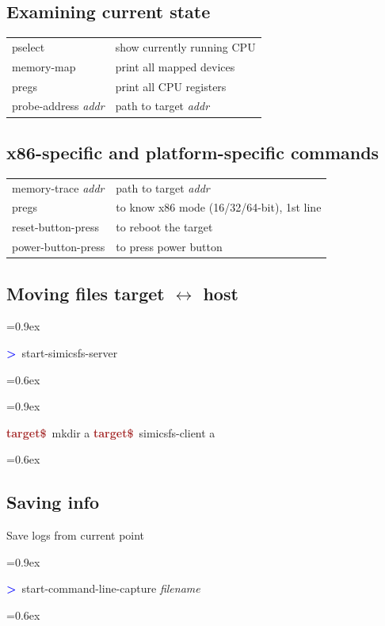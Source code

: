 \documentclass[8pt]{extarticle}
\newenvironment{code}[1][]{%
\begin{prebox}[#1]\obeylines%
\fontdimen2\font=0.9ex%
}{%
\end{prebox}%
\fontdimen2\font=0.6ex%
}
\newcommand{\tprompt}{\textcolor{brown}{\textbf{target\$}\ }}
\newcommand{\sprompt}{\textcolor{blue}{\textbf{>}\ }}
\newcommand{\p}[1]{\textit{\large#1}}
\begin{document}
\begin{multicols*}{3}
\subsection{Examining current state}

\noindent\begin{tabular}{ll}
    pselect & show currently running CPU \\
    memory-map & print all mapped devices \\
    pregs & print all CPU registers \\
    probe-address \p{addr} & path to target \p{addr}
\end{tabular}

\subsection{x86-specific and platform-specific commands}

\noindent\begin{tabular}{ll}
    memory-trace \p{addr} & path to target \p{addr} \\
    pregs & to know x86 mode (16/32/64-bit), 1st line \\
    reset-button-press & to reboot the target \\
    power-button-press & to press power button \\
\end{tabular}


\subsection{Moving files target \texorpdfstring{$\longleftrightarrow$}{<->} host}
\begin{code}
\sprompt start-simicsfs-server
\end{code}

\begin{code}[colback=blue!15]
\tprompt mkdir a
\tprompt simicsfs-client a
\end{code}

\subsection{Saving info}
Save logs from current point
\begin{code}
    \sprompt start-command-line-capture \p{filename}
\end{code}


\end{multicols*}
\end{document}
